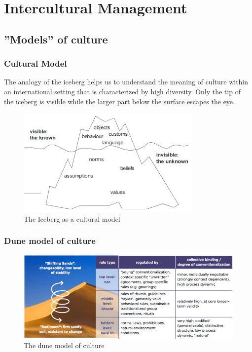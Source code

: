 \section{Intercultural Management}

\subsection{''Models'' of culture}

\subsubsection{Cultural Model}

The analogy of the iceberg helps us to understand the meaning of culture within an international setting that is characterized by high diversity. Only the tip of the iceberg is visible while the larger part below the surface escapes the eye.

\begin{figure}[H]
	\centering
	\includegraphics[width=0.8\textwidth]{figures/icebergCulture.png}
	\caption{The Iceberg as a cultural model}
\end{figure}

\subsubsection{Dune model of culture}

\begin{figure}[H]
	\centering
	\includegraphics[width=\textwidth]{figures/duneModelCulture.png}
	\caption{The dune model of culture}
\end{figure}

